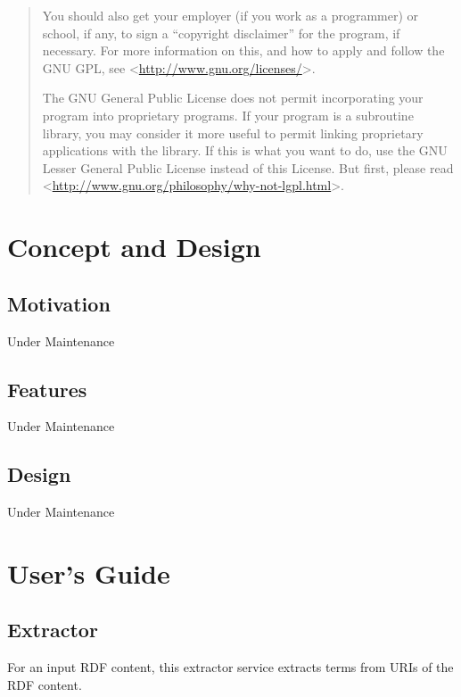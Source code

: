 \documentclass[letterpaper,10pt,english]{sphinxmanual}
\begin{document}
\begin{quote}
You should also get your employer (if you work as a programmer) or school,
if any, to sign a ``copyright disclaimer'' for the program, if necessary.
For more information on this, and how to apply and follow the GNU GPL, see
\textless{}\href{http://www.gnu.org/licenses/}{http://www.gnu.org/licenses/}\textgreater{}.

The GNU General Public License does not permit incorporating your program
into proprietary programs.  If your program is a subroutine library, you
may consider it more useful to permit linking proprietary applications with
the library.  If this is what you want to do, use the GNU Lesser General
Public License instead of this License.  But first, please read
\textless{}\href{http://www.gnu.org/philosophy/why-not-lgpl.html}{http://www.gnu.org/philosophy/why-not-lgpl.html}\textgreater{}.
\end{quote}


\chapter{Concept and Design}
\label{index:concept-and-design}

\section{Motivation}
\label{concept_design:concept-and-design}\label{concept_design:motivation}\label{concept_design::doc}
Under Maintenance


\section{Features}
\label{concept_design:features}
Under Maintenance


\section{Design}
\label{concept_design:design}
Under Maintenance


\chapter{User's Guide}
\label{index:user-s-guide}

\section{Extractor}
\label{user_guide:extractor}\label{user_guide:extractor-api}\label{user_guide::doc}
For an input RDF content, this extractor service extracts terms from URIs of the RDF content.
\end{document}
